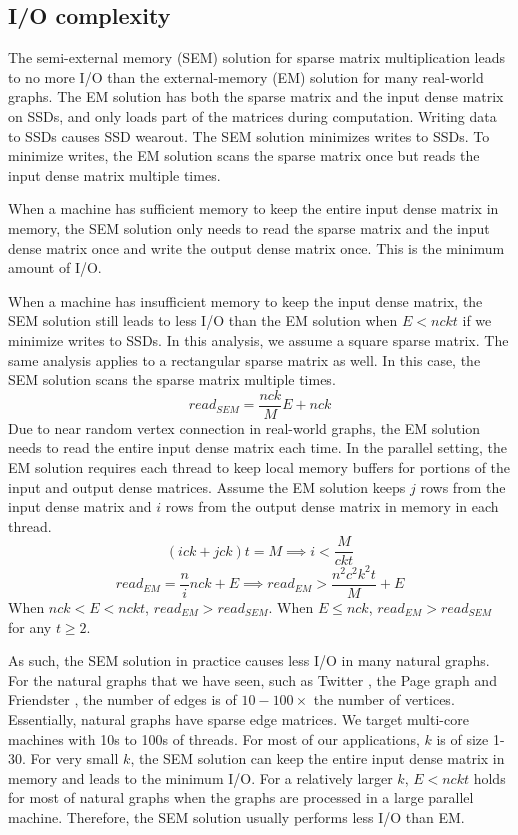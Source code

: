 \subsection{I/O complexity}
The semi-external memory (SEM) solution for sparse matrix multiplication leads
to no more I/O than the external-memory (EM) solution for many real-world graphs.
The EM solution has both the sparse matrix and the input dense matrix on SSDs,
and only loads part of the matrices during computation. Writing data to SSDs
causes SSD wearout. The SEM solution minimizes writes to SSDs. To minimize writes,
the EM solution scans the sparse matrix once but reads the input dense matrix
multiple times.

When a machine has sufficient memory to keep the entire input dense matrix
in memory, the SEM solution only needs to read the sparse matrix and the input
dense matrix once and write the output dense matrix once. This is
the minimum amount of I/O.

When a machine has insufficient memory to keep the input dense matrix, the SEM
solution still leads to less I/O than the EM solution when $E < n c k t$ if we
minimize writes to SSDs.
In this analysis, we assume a square sparse matrix. The same analysis applies
to a rectangular sparse matrix as well.
In this case, the SEM solution scans the sparse matrix multiple times.
\begin{equation*}
read_{SEM} = \frac{n c k}{M} E + n c k
\end{equation*}
Due to near random vertex connection in real-world graphs, the EM solution needs to
read the entire input dense matrix each time. In the parallel setting,
the EM solution requires each thread to keep local memory buffers for portions
of the input and output dense matrices. Assume the EM solution keeps $j$ rows
from the input dense matrix and $i$ rows from the output dense matrix in memory
in each thread.
\begin{equation*}
(i c k + j c k) t = M \implies i < \frac{M}{c k t}
\end{equation*}
\begin{equation*}
read_{EM} = \frac{n}{i} n c k + E \implies  read_{EM} > \frac{n^2 c^2 k^2 t}{M} + E
\end{equation*}
When $n c k < E < n c k t$, $read_{EM} > read_{SEM}$.
When $E \leq n c k$, $read_{EM} > read_{SEM}$ for any $t \geq 2$.

As such, the SEM solution in practice causes less I/O in many natural graphs.
For the natural graphs that we have seen, such as Twitter \cite{twitter},
the Page graph \cite{web_graph} and Friendster \cite{friendster}, the number
of edges is of $10-100 \times$ the number of vertices. Essentially,
natural graphs have sparse edge matrices. We target multi-core machines with
10s to 100s of threads. For most of our applications, $k$ is of size 1-30.
For very small $k$, the SEM solution can keep the entire input dense matrix
in memory and leads to the minimum I/O. For a relatively larger $k$, $E < n c k t$
holds for most of natural graphs when the graphs are processed in a large
parallel machine. Therefore, the SEM solution usually performs less I/O than EM.


